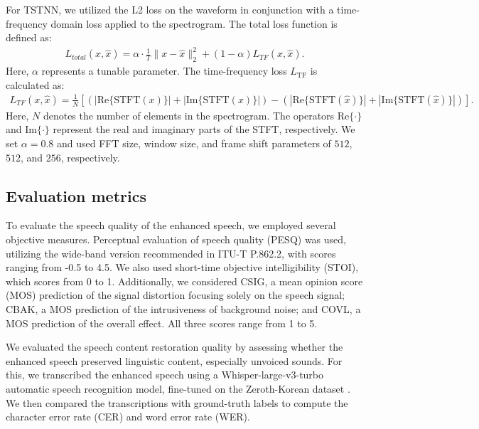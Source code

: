 \documentclass[10pt]{wlscirep}
\begin{document}
For TSTNN, we utilized the L2 loss on the waveform in conjunction with a time-frequency domain loss applied to the spectrogram. The total loss function is defined as:
\begin{align}
    L_{total}(x,\hat{x})=\alpha\cdot\frac{1}{T}\|x-\hat{x}\|_2^2+(1-\alpha)L_{TF}(x,\hat{x}).
\end{align}
Here, $\alpha$ represents a tunable parameter. The time-frequency loss $L_{\text{TF}}$ is calculated as:
\begin{align}
    L_{TF}(x,\hat{x})=\frac{1}{N}\left[ \left( \left| \text{Re} \{ \text{STFT}(x) \} \right| + \left| \text{Im} \{ \text{STFT}(x) \} \right| \right) - \left( \left| \text{Re} \{ \text{STFT}(\hat{x}) \} \right| + \left| \text{Im} \{ \text{STFT}(\hat{x}) \} \right| \right) \right].
\end{align}
Here, $N$ denotes the number of elements in the spectrogram. The operators $\text{Re}\{\cdot\}$ and $\text{Im}\{\cdot\}$ represent the real and imaginary parts of the STFT, respectively. We set $\alpha = 0.8$ and used FFT size, window size, and frame shift parameters of $512$, $512$, and $256$, respectively.

\subsection*{Evaluation metrics}
To evaluate the speech quality of the enhanced speech, we employed several objective measures. Perceptual evaluation of speech quality (PESQ)\cite{pesq} was used, utilizing the wide-band version recommended in ITU-T P.862.2, with scores ranging from -0.5 to 4.5. We also used short-time objective intelligibility (STOI)\cite{stoi}, which scores from 0 to 1. Additionally, we considered CSIG\cite{CsigCbakCovl}, a mean opinion score (MOS) prediction of the signal distortion focusing solely on the speech signal; CBAK\cite{CsigCbakCovl}, a MOS prediction of the intrusiveness of background noise; and COVL\cite{CsigCbakCovl}, a MOS prediction of the overall effect. All three scores range from 1 to 5.

We evaluated the speech content restoration quality by assessing whether the enhanced speech preserved linguistic content, especially unvoiced sounds. For this, we transcribed the enhanced speech using a Whisper-large-v3-turbo automatic speech recognition model\cite{radford2022whisper}, fine-tuned\cite{fine_tuned_radford2022whisper} on the Zeroth-Korean dataset \cite{Zeroth_Korean}. We then compared the transcriptions with ground-truth labels to compute the character error rate (CER) and word error rate (WER).
\end{document}
